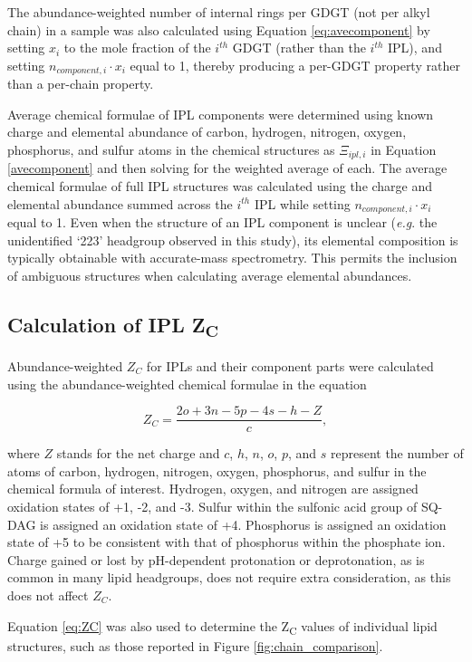 The abundance-weighted number of internal rings per GDGT (not per alkyl chain) in a sample was also calculated using Equation \ref{eq:avecomponent} by setting $x_{i}$ to the mole fraction of the $i^{th}$ GDGT (rather than the $i^{th}$ IPL), and setting $n_{component,i} \cdot x_{i}$ equal to 1, thereby producing a per-GDGT property rather than a per-chain property.

Average chemical formulae of IPL components were determined using known charge and elemental abundance of carbon, hydrogen, nitrogen, oxygen, phosphorus, and sulfur atoms in the chemical structures as $\Xi_{ipl,i}$ in Equation \ref{avecomponent} and then solving for the weighted average of each. The average chemical formulae of full IPL structures was calculated using the charge and elemental abundance summed across the $i^{th}$ IPL while setting $n_{component,i} \cdot x_{i}$ equal to 1. Even when the structure of an IPL component is unclear (\textit{e.g}. the unidentified `223' headgroup observed in this study), its elemental composition is typically obtainable with accurate-mass spectrometry. This permits the inclusion of ambiguous structures when calculating average elemental abundances.

\subsection{Calculation of IPL Z\textsubscript{C}}
Abundance-weighted $Z_{C}$ for IPLs and their component parts were calculated using the abundance-weighted chemical formulae in the equation

\begin{equation} \label{eq:ZC}
{Z}_{C} = \frac{2o + 3n - 5p - 4s - h - Z}{c},
\end{equation}

\noindent where $Z$ stands for the net charge and $c$, $h$, $n$, $o$, $p$, and $s$ represent the number of atoms of carbon, hydrogen, nitrogen, oxygen, phosphorus, and sulfur in the chemical formula of interest. Hydrogen, oxygen, and nitrogen are assigned oxidation states of +1, -2, and -3. Sulfur within the sulfonic acid group of SQ-DAG is assigned an oxidation state of +4. Phosphorus is assigned an oxidation state of +5 to be consistent with that of phosphorus within the phosphate ion. Charge gained or lost by pH-dependent protonation or deprotonation, as is common in many lipid headgroups, does not require extra consideration, as this does not affect $Z_{C}$.

Equation \ref{eq:ZC} was also used to determine the Z\textsubscript{C} values of individual lipid structures, such as those reported in Figure \ref{fig:chain_comparison}.

